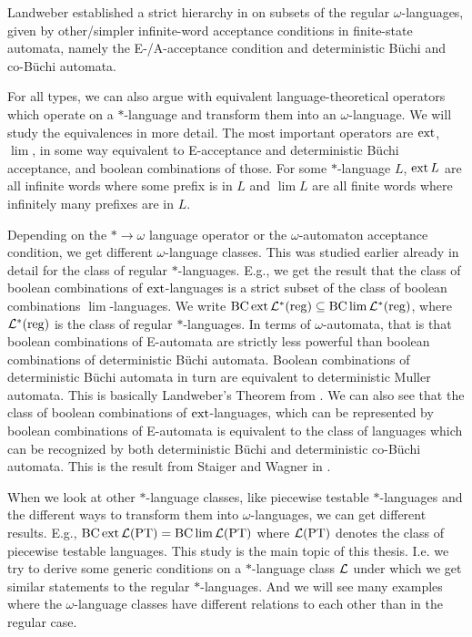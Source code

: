 Landweber established a strict hierarchy in \cite{Landweber69} on subsets of the regular $\omega$-languages, given by other/simpler infinite-word acceptance conditions in finite-state automata, namely the E-/A-acceptance condition and deterministic Büchi and co-Büchi automata.

For all types, we can also argue with equivalent language-theoretical operators which operate on a $*$-language and transform them into an $\omega$-language. We will study the equivalences in more detail. The most important operators are $\operatorname{ext}$, $\lim$, in some way equivalent to E-acceptance and deterministic Büchi acceptance, and boolean combinations of those. For some $*$-language $L$, $\operatorname{ext} L$ are all infinite words where some prefix is in $L$ and $\lim L$ are all finite words where infinitely many prefixes are in $L$.

Depending on the $* \rightarrow \omega$ language operator or the $\omega$-automaton acceptance condition, we get different $\omega$-language classes. This was studied earlier already in detail for the class of regular $*$-languages. E.g., we get the result that the class of boolean combinations of $\operatorname{ext}$-languages is a strict subset of the class of boolean combinations $\lim$-languages. We write $\operatorname{BC} \operatorname{ext} \mathcal{L}^*(\textup{\textrm{reg}}) \subseteq \operatorname{BC} \lim \mathcal{L}^*(\textup{\textrm{reg}})$, where $\mathcal{L}^*(\textup{\textrm{reg}})$ is the class of regular $*$-languages. In terms of $\omega$-automata, that is that boolean combinations of E-automata are strictly less powerful than boolean combinations of deterministic Büchi automata. Boolean combinations of deterministic Büchi automata in turn are equivalent to deterministic Muller automata. This is basically Landweber's Theorem from \cite{Landweber69}. We can also see that the class of boolean combinations of $\operatorname{ext}$-languages, which can be represented by boolean combinations of E-automata is equivalent to the class of languages which can be recognized by both deterministic Büchi and deterministic co-Büchi automata. This is the result from Staiger and Wagner in \cite{StaigerW74}.

When we look at other $*$-language classes, like piecewise testable $*$-languages and the different ways to transform them into $\omega$-languages, we can get different results. E.g., $\operatorname{BC} \operatorname{ext} \mathcal{L}(\textup{\textrm{PT}}) = \operatorname{BC} \lim \mathcal{L}(\textup{\textrm{PT}})$ where $\mathcal{L}(\textup{\textrm{PT}})$ denotes the class of piecewise testable languages. This study is the main topic of this thesis. I.e. we try to derive some generic conditions on a $*$-language class $\mathcal{L}$ under which we get similar statements to the regular $*$-languages. And we will see many examples where the $\omega$-language classes have different relations to each other than in the regular case.


